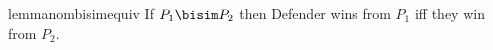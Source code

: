 \begin{restatable}{lemma}{nombisimequiv}\label{lem:nombisimequiv}
If $P_1\bisim P_2$ then Defender wins from $P_1$ iff they win from $P_2$.
\end{restatable}

%


